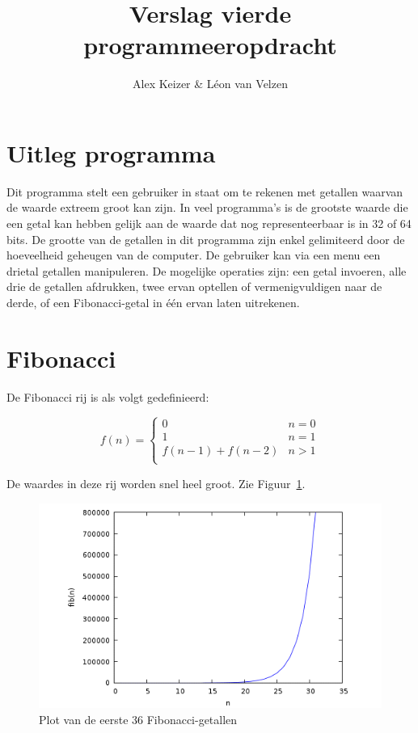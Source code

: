 \documentclass[10pt]{article}
\title{\vspace{-1.3cm} Verslag vierde programmeeropdracht}
\author{Alex Keizer \& L\'{e}on van Velzen}
\begin{document}
\maketitle
\section{Uitleg programma}

Dit programma stelt een gebruiker in staat om te rekenen met getallen waarvan de waarde extreem groot kan zijn. In veel programma's is de grootste waarde die een getal kan hebben gelijk aan de waarde dat nog representeerbaar is in 32 of 64 bits. De grootte van de getallen in dit programma zijn enkel gelimiteerd door de hoeveelheid geheugen van de computer. De gebruiker kan via een menu een drietal getallen manipuleren. De mogelijke operaties zijn: een getal invoeren, alle drie de getallen afdrukken, twee ervan optellen of vermenigvuldigen naar de derde, of een Fibonacci-getal in \'e\'en ervan laten uitrekenen. 

\section{Fibonacci}

De Fibonacci rij is als volgt gedefinieerd:

\begin{equation*}
    f(n) = \begin{cases}
               0               & n = 0\\
               1               & n = 1\\
               f(n-1) + f(n-2) & n > 1\\
           \end{cases}
\end{equation*}

De waardes in deze rij worden snel heel groot. Zie Figuur~\ref{fig:fibo}.

\begin{figure}[!ht]
\begin{center}
    \includegraphics[scale=0.6]{graph.png}
\end{center}
\caption{Plot van de eerste 36 Fibonacci-getallen}\label{fig:fibo}
\end{figure}
\end{document}
